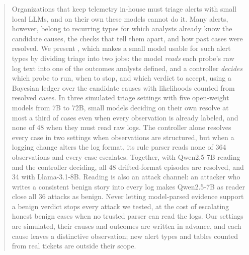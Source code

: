 \begin{abstract}
Organizations that keep telemetry in-house must triage alerts with small local LLMs, and on their own these models cannot do it. Many alerts, however, belong to recurring types for which analysts already know the candidate causes, the checks that tell them apart, and how past cases were resolved. We present \hesp{}, which makes a small model usable for such alert types by dividing triage into two jobs: the model \emph{reads} each probe's raw log text into one of the outcomes analysts defined, and a controller \emph{decides} which probe to run, when to stop, and which verdict to accept, using a Bayesian ledger over the candidate causes with likelihoods counted from resolved cases. In three simulated triage settings with five open-weight models from 7B to 72B, small models deciding on their own resolve at most a third of cases even when every observation is already labeled, and none of 48 when they must read raw logs. The controller alone resolves every case in two settings when observations are structured, but when a logging change alters the log format, its rule parser reads none of 364 observations and every case escalates. Together, with Qwen2.5-7B reading and the controller deciding, all 48 drifted-format episodes are resolved, and 34 with Llama-3.1-8B. Reading is also an attack channel: an attacker who writes a consistent benign story into every log makes Qwen2.5-7B as reader close all 36 attacks as benign. Never letting model-parsed evidence support a benign verdict stops every attack we tested, at the cost of escalating honest benign cases when no trusted parser can read the logs. Our settings are simulated, their causes and outcomes are written in advance, and each cause leaves a distinctive observation; new alert types and tables counted from real tickets are outside their scope.
\end{abstract}
